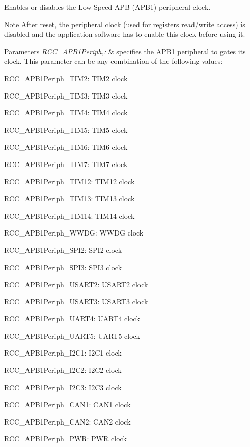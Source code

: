 Enables or disables the Low Speed A\-P\-B (A\-P\-B1) peripheral clock. 

\begin{DoxyNote}{Note}
After reset, the peripheral clock (used for registers read/write access) is disabled and the application software has to enable this clock before using it. 
\end{DoxyNote}

\begin{DoxyParams}{Parameters}
{\em R\-C\-C\-\_\-\-A\-P\-B1\-Periph,\-:} & specifies the A\-P\-B1 peripheral to gates its clock. This parameter can be any combination of the following values\-: \begin{DoxyItemize}
\item R\-C\-C\-\_\-\-A\-P\-B1\-Periph\-\_\-\-T\-I\-M2\-: T\-I\-M2 clock \item R\-C\-C\-\_\-\-A\-P\-B1\-Periph\-\_\-\-T\-I\-M3\-: T\-I\-M3 clock \item R\-C\-C\-\_\-\-A\-P\-B1\-Periph\-\_\-\-T\-I\-M4\-: T\-I\-M4 clock \item R\-C\-C\-\_\-\-A\-P\-B1\-Periph\-\_\-\-T\-I\-M5\-: T\-I\-M5 clock \item R\-C\-C\-\_\-\-A\-P\-B1\-Periph\-\_\-\-T\-I\-M6\-: T\-I\-M6 clock \item R\-C\-C\-\_\-\-A\-P\-B1\-Periph\-\_\-\-T\-I\-M7\-: T\-I\-M7 clock \item R\-C\-C\-\_\-\-A\-P\-B1\-Periph\-\_\-\-T\-I\-M12\-: T\-I\-M12 clock \item R\-C\-C\-\_\-\-A\-P\-B1\-Periph\-\_\-\-T\-I\-M13\-: T\-I\-M13 clock \item R\-C\-C\-\_\-\-A\-P\-B1\-Periph\-\_\-\-T\-I\-M14\-: T\-I\-M14 clock \item R\-C\-C\-\_\-\-A\-P\-B1\-Periph\-\_\-\-W\-W\-D\-G\-: W\-W\-D\-G clock \item R\-C\-C\-\_\-\-A\-P\-B1\-Periph\-\_\-\-S\-P\-I2\-: S\-P\-I2 clock \item R\-C\-C\-\_\-\-A\-P\-B1\-Periph\-\_\-\-S\-P\-I3\-: S\-P\-I3 clock \item R\-C\-C\-\_\-\-A\-P\-B1\-Periph\-\_\-\-U\-S\-A\-R\-T2\-: U\-S\-A\-R\-T2 clock \item R\-C\-C\-\_\-\-A\-P\-B1\-Periph\-\_\-\-U\-S\-A\-R\-T3\-: U\-S\-A\-R\-T3 clock \item R\-C\-C\-\_\-\-A\-P\-B1\-Periph\-\_\-\-U\-A\-R\-T4\-: U\-A\-R\-T4 clock \item R\-C\-C\-\_\-\-A\-P\-B1\-Periph\-\_\-\-U\-A\-R\-T5\-: U\-A\-R\-T5 clock \item R\-C\-C\-\_\-\-A\-P\-B1\-Periph\-\_\-\-I2\-C1\-: I2\-C1 clock \item R\-C\-C\-\_\-\-A\-P\-B1\-Periph\-\_\-\-I2\-C2\-: I2\-C2 clock \item R\-C\-C\-\_\-\-A\-P\-B1\-Periph\-\_\-\-I2\-C3\-: I2\-C3 clock \item R\-C\-C\-\_\-\-A\-P\-B1\-Periph\-\_\-\-C\-A\-N1\-: C\-A\-N1 clock \item R\-C\-C\-\_\-\-A\-P\-B1\-Periph\-\_\-\-C\-A\-N2\-: C\-A\-N2 clock \item R\-C\-C\-\_\-\-A\-P\-B1\-Periph\-\_\-\-P\-W\-R\-: P\-W\-R clock \item 
\end{DoxyItemize}
\end{DoxyParams}
